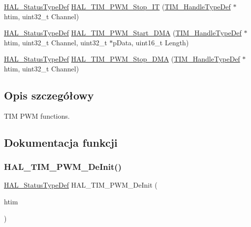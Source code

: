 \begin{DoxyCompactItemize}
\item 
\hyperlink{stm32f4xx__hal__def_8h_a63c0679d1cb8b8c684fbb0632743478f}{H\+A\+L\+\_\+\+Status\+Type\+Def} \hyperlink{group___t_i_m___exported___functions___group3_ga0559af125dc5fb2bb183a6a4b86808b5}{H\+A\+L\+\_\+\+T\+I\+M\+\_\+\+P\+W\+M\+\_\+\+Stop\+\_\+\+IT} (\hyperlink{struct_t_i_m___handle_type_def}{T\+I\+M\+\_\+\+Handle\+Type\+Def} $\ast$htim, uint32\+\_\+t Channel)
\item 
\hyperlink{stm32f4xx__hal__def_8h_a63c0679d1cb8b8c684fbb0632743478f}{H\+A\+L\+\_\+\+Status\+Type\+Def} \hyperlink{group___t_i_m___exported___functions___group3_gaa4b542b3c0ae347ea580c9e7c8e88b17}{H\+A\+L\+\_\+\+T\+I\+M\+\_\+\+P\+W\+M\+\_\+\+Start\+\_\+\+D\+MA} (\hyperlink{struct_t_i_m___handle_type_def}{T\+I\+M\+\_\+\+Handle\+Type\+Def} $\ast$htim, uint32\+\_\+t Channel, uint32\+\_\+t $\ast$p\+Data, uint16\+\_\+t Length)
\item 
\hyperlink{stm32f4xx__hal__def_8h_a63c0679d1cb8b8c684fbb0632743478f}{H\+A\+L\+\_\+\+Status\+Type\+Def} \hyperlink{group___t_i_m___exported___functions___group3_gad77367f9b8d8d17842a913f7d6ce274b}{H\+A\+L\+\_\+\+T\+I\+M\+\_\+\+P\+W\+M\+\_\+\+Stop\+\_\+\+D\+MA} (\hyperlink{struct_t_i_m___handle_type_def}{T\+I\+M\+\_\+\+Handle\+Type\+Def} $\ast$htim, uint32\+\_\+t Channel)
\end{DoxyCompactItemize}


\subsection{Opis szczegółowy}
T\+IM P\+WM functions. 



\subsection{Dokumentacja funkcji}
\mbox{\label{group___t_i_m___exported___functions___group3_ga5bb7b197ace5bab9ef120163ff1520bd}} 
\subsubsection{\texorpdfstring{H\+A\+L\+\_\+\+T\+I\+M\+\_\+\+P\+W\+M\+\_\+\+De\+Init()}{HAL\_TIM\_PWM\_DeInit()}}
{\footnotesize\ttfamily \hyperlink{stm32f4xx__hal__def_8h_a63c0679d1cb8b8c684fbb0632743478f}{H\+A\+L\+\_\+\+Status\+Type\+Def} H\+A\+L\+\_\+\+T\+I\+M\+\_\+\+P\+W\+M\+\_\+\+De\+Init (\begin{DoxyParamCaption}\item[{\hyperlink{struct_t_i_m___handle_type_def}{T\+I\+M\+\_\+\+Handle\+Type\+Def} $\ast$}]{htim }\end{DoxyParamCaption})}

